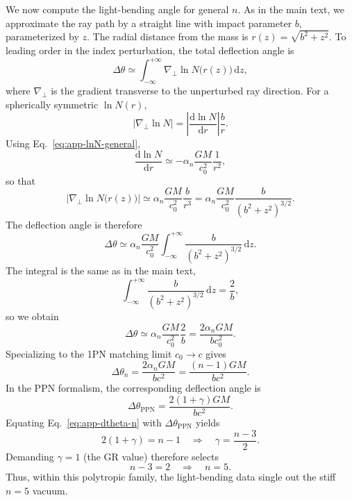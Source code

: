 \documentclass[11pt]{article}
\begin{document}
We now compute the light-bending angle for general $n$.
As in the main text, we approximate the ray path by a straight line with
impact parameter $b$, parameterized by $z$.
The radial distance from the mass is $r(z) = \sqrt{b^2 + z^2}$.
To leading order in the index perturbation, the total deflection angle is
\begin{equation}
  \Delta\theta
  \simeq \int_{-\infty}^{+\infty}
         \nabla_\perp \ln N\bigl(r(z)\bigr)\,\mathrm{d}z,
\end{equation}
where $\nabla_\perp$ is the gradient transverse to the unperturbed ray
direction.
For a spherically symmetric $\ln N(r)$,
\begin{equation}
  \left|\nabla_\perp \ln N\right|
  = \left|\frac{\mathrm{d}\ln N}{\mathrm{d}r}\right|\frac{b}{r}.
\end{equation}
Using Eq.~\eqref{eq:app-lnN-general},
\begin{equation}
  \frac{\mathrm{d}\ln N}{\mathrm{d}r}
  \simeq -\alpha_n \frac{GM}{c_0^2}\frac{1}{r^2},
\end{equation}
so that
\begin{equation}
  \left|\nabla_\perp \ln N\bigl(r(z)\bigr)\right|
  \simeq \alpha_n \frac{GM}{c_0^2}\frac{b}{r^3}
  = \alpha_n \frac{GM}{c_0^2}
    \frac{b}{(b^2+z^2)^{3/2}}.
\end{equation}
The deflection angle is therefore
\begin{equation}
  \Delta\theta
  \simeq \alpha_n \frac{GM}{c_0^2}
         \int_{-\infty}^{+\infty}
         \frac{b}{(b^2+z^2)^{3/2}}\,\mathrm{d}z.
\end{equation}
The integral is the same as in the main text,
\begin{equation}
  \int_{-\infty}^{+\infty}
  \frac{b}{(b^2+z^2)^{3/2}}\,\mathrm{d}z
  = \frac{2}{b},
\end{equation}
so we obtain
\begin{equation}
  \Delta\theta
  \simeq \alpha_n \frac{GM}{c_0^2}\frac{2}{b}
  = \frac{2\alpha_n GM}{b c_0^2}.
\end{equation}
Specializing to the 1PN matching limit $c_0\to c$ gives
\begin{equation}
  \Delta\theta_n
  = \frac{2\alpha_n GM}{b c^2}
  = \frac{(n-1)GM}{b c^2}.
  \label{eq:app-dtheta-n}
\end{equation}
In the PPN formalism, the corresponding deflection angle is
\begin{equation}
  \Delta\theta_{\text{PPN}}
  = \frac{2(1+\gamma)GM}{b c^2}.
\end{equation}
Equating Eq.~\eqref{eq:app-dtheta-n} with $\Delta\theta_{\text{PPN}}$ yields
\begin{equation}
  2(1+\gamma) = n-1
  \quad\Rightarrow\quad
  \gamma = \frac{n-3}{2}.
\end{equation}
Demanding $\gamma = 1$ (the GR value) therefore selects
\begin{equation}
  n-3 = 2
  \quad\Rightarrow\quad
  n = 5.
\end{equation}
Thus, within this polytropic family, the light-bending data single out the
stiff $n=5$ vacuum.
\end{document}
